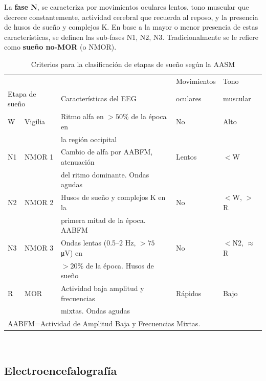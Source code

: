 \documentclass[12pt,letterpaper]{book}
\newcommand{\hz}{\si{\hertz}\xspace}
\newcommand{\mv}{\si{\micro\volt}\xspace}
\begin{document}
%
La \textbf{fase N}, se caracteriza por movimientos oculares lentos, tono muscular que decrece 
constantemente, actividad cerebral que recuerda al reposo, y la presencia de husos de sueño y 
complejos K. 
%
En base a la mayor o menor presencia de estas características, se definen las sub-fases N1, N2, N3.
%
Tradicionalmente se le refiere como \textbf{sueño no-MOR} (o NMOR).

\begin{table}
\caption[Criterios para la clasificación de etapas de sueño]
{Criterios para la clasificación de etapas de sueño según la AASM}
\centering
{\small
\begin{tabular}{lllll}
\toprule
&&   & Movimientos & Tono \\
\multicolumn{2}{l}{Etapa de sueño}& Características del EEG & oculares & muscular \\
\midrule
 W  & Vigilia & {Ritmo alfa} en $>50$\% de la época en   & No & Alto \\
    &         & la región occipital                &    &      \\
 N1 & NMOR 1  & Cambio de alfa por AABFM, atenuación & Lentos & $<$W     \\
    &         & del ritmo dominante. Ondas agudas   &    &      \\
 N2 & NMOR 2  & Husos de sueño y complejos K en la    & No & $<$W, $>$R     \\
    &         & primera mitad de la época. AABFM &    &     \\
 N3 & NMOR 3  & {Ondas lentas} (0.5--2 \hz, $>75$ \mv) en& No & $<$N2, $\approx$R \\
    &         & $>20$\% de la época. Husos de sueño       &&      \\
 R  & MOR     & Actividad baja amplitud y frecuencias & Rápidos & Bajo  \\
    &         & mixtas. Ondas agudas             &       &       \\
\bottomrule
\multicolumn{4}{l}{AABFM=Actividad de Amplitud Baja y Frecuencias Mixtas.}
\end{tabular}\\
}
\label{cuadro:aasm}
\end{table}


\subsection{Electroencefalografía}
\label{sec:eeg}
\end{document}
